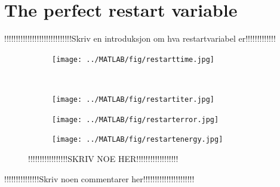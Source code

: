 \chapter{The perfect restart variable}
!!!!!!!!!!!!!!!!!!!!!!!!!!!!!Skriv en introduksjon om hva restartvariabel er!!!!!!!!!!!!!\\
\begin{figure}[H]
        \centering
        \begin{subfigure}[b]{0.45\textwidth}
                \texttt{[image: ../MATLAB/fig/restarttime.jpg]}
                \caption{  }
                \label{fig:restarttimeprob1}
        \end{subfigure}
        ~
        \begin{subfigure}[b]{0.45\textwidth}
                \texttt{[image: ../MATLAB/fig/restartiter.jpg]}
                \caption{  }
                \label{fig:restarttimeprob2}
        \end{subfigure}
        \begin{subfigure}[b]{0.45\textwidth}
                \texttt{[image: ../MATLAB/fig/restarterror.jpg]}
                \caption{  }
                \label{fig:restarttimeprob2}
        \end{subfigure}
        \begin{subfigure}[b]{0.45\textwidth}
                \texttt{[image: ../MATLAB/fig/restartenergy.jpg]}
                \caption{  }
                \label{fig:restarttimeprob2}
        \end{subfigure}
        \caption{ !!!!!!!!!!!!!!!!!SKRIV NOE HER!!!!!!!!!!!!!!!!!!  }
        \label{fig:restarttimeprob}
\end{figure}
!!!!!!!!!!!!!!!Skriv noen commentarer her!!!!!!!!!!!!!!!!!!!!!!\\


